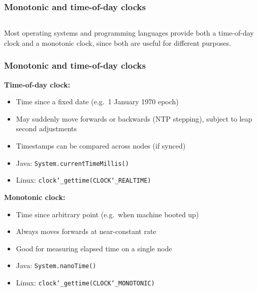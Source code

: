 \begin{frame}
    \label{s:monotonic-clock}
    \frametitle{Monotonic and time-of-day clocks}
    \inputminted{java}{code/nonmonotonic.java}
\end{frame}
\label{l:monotonic-clock}

Most operating systems and programming languages provide both a time-of-day clock and a monotonic clock, since both are useful for different purposes.

\begin{frame}
    \label{s:monotonic-comparison}
    \frametitle{Monotonic and time-of-day clocks}
    \textbf{Time-of-day clock:}
    \begin{itemize}
        \item<1-> Time since a fixed date (e.g.\ 1 January 1970 epoch)
        \item<2-> May suddenly move forwards or backwards (NTP stepping), subject to leap second adjustments
        \item<3-> Timestamps can be compared across nodes (if synced)
        \item<4-> Java: \texttt{System.currentTimeMillis()}
        \item<4-> Linux: \texttt{clock\char`_gettime(CLOCK\char`_REALTIME)}\\[1em]
    \end{itemize}
    \textbf{Monotonic clock:}
    \begin{itemize}
        \item<1-> Time since arbitrary point (e.g.\ when machine booted up)
        \item<2-> Always moves forwards at near-constant rate
        \item<3-> Good for measuring elapsed time on a single node
        \item<4-> Java: \texttt{System.nanoTime()}
        \item<4-> Linux: \texttt{clock\char`_gettime(CLOCK\char`_MONOTONIC)}
    \end{itemize}
\end{frame}
\label{l:monotonic-comparison}

